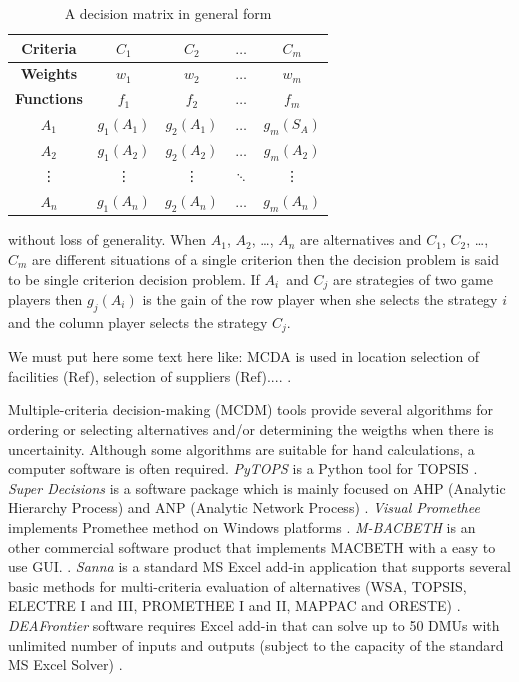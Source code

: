 \documentclass[preprint,review, 12pt, a4paper]{elsarticle}
\begin{document}
\begin{table}[H]
	\centering
	\begin{tabular}{|c|c|c|c|c|}
		\hline
		\textbf{Criteria} & {$C_1$} & {$C_2$} & $\dots$ & {$C_m$} \\
		\hline
		\textbf{Weights} & {$w_1$} & {$w_2$} & $\dots$ & {$w_m$} \\
		\hline
		\textbf{Functions} & {$f_1$} & {$f_2$} & $\dots$ & {$f_m$} \\
		\hline
		\hline
		{$A_1$} & {$g_1(A_1)$} & {$g_2(A_1)$} & $\dots$ & {$g_m(S_A)$} \\
		\hline
		{$A_2$} & {$g_1(A_2)$} & {$g_2(A_2)$} & $\dots$ & {$g_m(A_2)$} \\
		\hline
		\vdots & \vdots & \vdots & $\ddots$ & \vdots  \\
		\hline		
		$A_n$ & $g_1(A_n) $ &  $g_2(A_n) $ & $\dots$ &  $g_m(A_n) $ \\
		\hline   
	\end{tabular}
	\caption{A decision matrix in general form}
	\label{table:sample_decision_matrix} 
\end{table}

\noindent without loss of generality. When $A_1$, $A_2$, \dots, $A_n$ are alternatives and $C_1$, $C_2$, \dots, $C_m$ are different situations of a single criterion then the decision problem is said to be single criterion decision problem. If $A_i$ and $C_j$ are strategies of two game players then $g_j(A_i)$ is the gain of the row player when she selects the strategy $i$ and the column player selects the strategy $C_j$. 

{\color{red}We must put here some text here like:
MCDA is used in location selection of facilities (Ref), selection of suppliers (Ref)....
.}

Multiple-criteria decision-making (MCDM) tools provide several algorithms for ordering or  selecting alternatives and/or determining the weigths when there is uncertainity. Although some algorithms are suitable for hand calculations, a computer software is often required. \emph{PyTOPS} is a Python tool for TOPSIS \cite{PyTOPS}. \emph{Super Decisions} is a software package which is mainly focused on AHP (Analytic Hierarchy Process) and ANP (Analytic Network Process) \cite{superdecision}. \emph{Visual Promethee} implements Promethee method on Windows platforms \cite{visualpromethee}. \emph{M-BACBETH} is an other commercial software product that implements MACBETH with a easy to use GUI.  \cite{macbeth}. \emph{Sanna} is a standard MS Excel add-in application that supports several basic methods for multi-criteria evaluation of alternatives (WSA, TOPSIS, ELECTRE I and III, PROMETHEE I and II, MAPPAC and ORESTE) \cite{sanna}. \emph{DEAFrontier} software requires Excel add-in that can solve up to 50 DMUs with unlimited number of inputs and outputs (subject to the capacity of the standard MS Excel Solver) \cite{deafrontier}.
\end{document}
